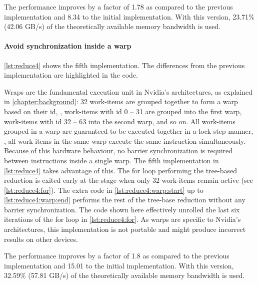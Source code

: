 The performance improves by a factor of 1.78 as compared to the previous implementation and 8.34 to the initial implementation.
With this version, 23.71\% (42.06 GB/s) of the theoretically available memory bandwidth is used.



\FloatBarrier
\newpage
\paragraph{Avoid synchronization inside a warp}

\autoref{lst:reduce4} shows the fifth implementation.
The differences from the previous implementation are highlighted in the code.

Wraps are the fundamental execution unit in Nvidia's \GPU architectures, as explained in \autoref{chapter:background}:
32 work-items are grouped together to form a warp based on their id, \ie, work-items with id $0$ -- 31 are grouped into the first warp, work-items with id 32 -- 63 into the second warp, and so on.
All work-items grouped in a warp are guaranteed to be executed together in a lock-step manner, \ie, all work-items in the same warp execute the same instruction simultaneously.
Because of this hardware behaviour, no barrier synchronization is required between instructions inside a single warp.
The fifth implementation in \autoref{lst:reduce4} takes advantage of this.
The for loop performing the tree-based reduction is exited early at the stage when only 32 work-items remain active (see \autoref{lst:reduce4:for}).
The extra code in \autoref{lst:reduce4:warp:start} up to \autoref{lst:reduce4:warp:end} performs the rest of the tree-base reduction without any barrier synchronization.
The code shown here effectively unrolled the last six iterations of the for loop in \autoref{lst:reduce4:for}.
As warps are specific to Nvidia's \GPU architectures, this implementation is not portable and might produce incorrect results on other \OpenCL devices.

The performance improves by a factor of 1.8 as compared to the previous implementation and 15.01 to the initial implementation.
With this version, 32.59\% (57.81 GB/s) of the theoretically available memory bandwidth is used.

